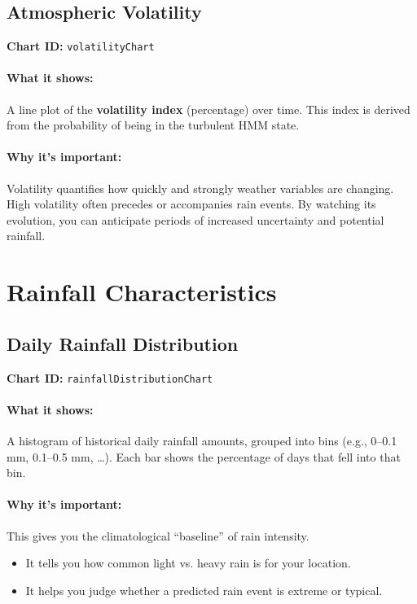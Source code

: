 \documentclass[11pt,a4paper]{article}
\begin{document}
	\subsection{Atmospheric Volatility}
	\textbf{Chart ID:} \texttt{volatilityChart}
	
	\paragraph{What it shows:}
	A line plot of the \textbf{volatility index} (percentage) over time. This index is derived from the probability of being in the turbulent HMM state.
	
	\paragraph{Why it’s important:}
	Volatility quantifies how quickly and strongly weather variables are changing. High volatility often precedes or accompanies rain events. By watching its evolution, you can anticipate periods of increased uncertainty and potential rainfall.
	
	\section{Rainfall Characteristics}
	
	\subsection{Daily Rainfall Distribution}
	\textbf{Chart ID:} \texttt{rainfallDistributionChart}
	
	\paragraph{What it shows:}
	A histogram of historical daily rainfall amounts, grouped into bins (e.g., 0–0.1 mm, 0.1–0.5 mm, …). Each bar shows the percentage of days that fell into that bin.
	
	\paragraph{Why it’s important:}
	This gives you the climatological “baseline” of rain intensity.
	\begin{itemize}
		\item It tells you how common light vs. heavy rain is for your location.
		\item It helps you judge whether a predicted rain event is extreme or typical.
	\end{itemize}
	
\end{document}
